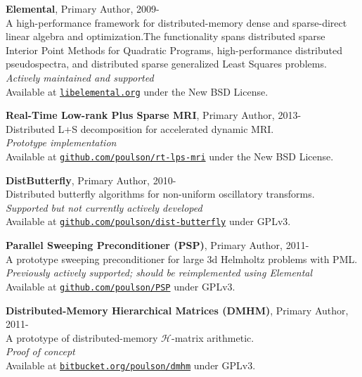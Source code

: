 \documentclass[letterpaper]{article}
\renewenvironment{itemize}{
  \begin{list}{}{
    \setlength{\leftmargin}{1.5em}
  }
}{
  \end{list}
}
\begin{document}
\begin{itemize}
\item {\bf Elemental}, Primary Author, 2009-\\
A high-performance framework for distributed-memory dense and sparse-direct linear algebra and optimization.The functionality spans distributed sparse Interior Point Methods for Quadratic Programs, high-performance distributed 
pseudospectra, and distributed sparse generalized Least Squares problems. \\ 
{\it Actively maintained and supported}\\
Available at 
\href{http://libelemental.org}{\tt libelemental.org} under the New BSD License.

\item {\bf Real-Time Low-rank Plus Sparse MRI}, Primary Author, 2013-\\
Distributed L+S decomposition for accelerated dynamic MRI.\\ 
{\it Prototype implementation}\\
Available at
\href{https://github.com/poulson/rt-lps-mri}{\tt github.com/poulson/rt-lps-mri} 
under the New BSD License.

\item {\bf DistButterfly}, Primary Author, 2010-\\
Distributed butterfly algorithms for non-uniform oscillatory transforms.\\
{\it Supported but not currently actively developed}\\
Available at
\href{https://github.com/poulson/dist-butterfly}{\tt github.com/poulson/dist-butterfly}
 under GPLv3.

\item {\bf Parallel Sweeping Preconditioner (PSP)}, Primary Author, 2011-\\
A prototype sweeping preconditioner for large 3d Helmholtz problems with  PML.\\
{\it Previously actively supported; should be reimplemented using Elemental}\\
Available at
\href{https://github.com/poulson/PSP}{\tt github.com/poulson/PSP} under GPLv3.

\item {\bf Distributed-Memory Hierarchical Matrices (DMHM)}, Primary Author, 2011-\\
A prototype of distributed-memory $\mathcal{H}$-matrix arithmetic. \\
{\it Proof of concept}\\
Available at
\href{https://bitbucket.org/poulson/dmhm}{\tt bitbucket.org/poulson/dmhm} under GPLv3.


\end{itemize}
\end{document}
